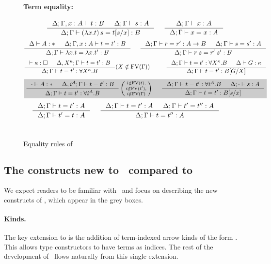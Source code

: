 \begin{figure*}
\paragraph{Term equality:} 
$ \qquad
 ~~~~
   \inference{\Delta;\Gamma,x:A |- t:B & \Delta;\Gamma |- s:A}
             {\Delta;\Gamma |- (\lambda x.t)\,s=t[s/x] : B}
 ~~~~
   \inference{\Delta;\Gamma |- x:A}{\Delta;\Gamma |- x=x:A}
$
\[ \inference{\Delta |- A:* & \Delta;\Gamma,x:A |- t=t':B}
             {\Delta;\Gamma |- \lambda x.t = \lambda x.t':B}
 ~~~~
   \inference{\Delta;\Gamma |- r=r':A-> B & \Delta;\Gamma |- s=s':A}
             {\Delta;\Gamma |- r\;s=r'\;s':B}
\]
\[ \inference{|- \kappa:\square & \Delta, X^\kappa;\Gamma |- t=t' : B}
             {\Delta;\Gamma |- t=t' : \forall X^\kappa.B}
	     (X\notin\FV(\Gamma))
 ~~~~ ~~~~
   \inference{ \Delta;\Gamma |- t=t' : \forall X^\kappa.B
             & \Delta |- G:\kappa }
             {\Delta;\Gamma |- t=t' : B[G/X]}
\]
\[ \newFi{
   \inference{\cdot |- A:* & \Delta, i^A;\Gamma |- t=t' : B}
             {\Delta;\Gamma |- t=t' : \forall i^A.B}
   \left(\begin{smallmatrix}
		i\notin\FV(t),\\
		i\notin\FV(t'),\\
		i\notin\FV(\Gamma)\end{smallmatrix}\right)
 ~~~~
   \inference{ \Delta;\Gamma |- t=t' : \forall i^A.B
             & \Delta;\cdot |- s:A}
             {\Delta;\Gamma |- t=t' : B[s/x]} }
\]
\[ \inference{\Delta;\Gamma |- t=t':A}{\Delta;\Gamma |- t'=t:A}
 ~~~~
   \inference{\Delta;\Gamma |- t=t':A & \Delta;\Gamma |- t'=t'':A}
             {\Delta;\Gamma |- t=t'':A}
\]
~\\
\caption{Equality rules of \Fi}
\label{fig:eqFi}
\end{figure*}

\subsection{The constructs new to \Fi\ compared to \Fw} \label{ssec:newFi}
We expect readers to be familiar with \Fw\
and focus on describing the new constructs of \Fi, which appear in the grey boxes.


\paragraph{Kinds.}
The key extension to \Fw is the addition of term-indexed arrow kinds of the form
\newFi{A -> \kappa}. This allows type constructors to have terms as indices.
The rest of the development of \Fi\ flows naturally from this single extension.

